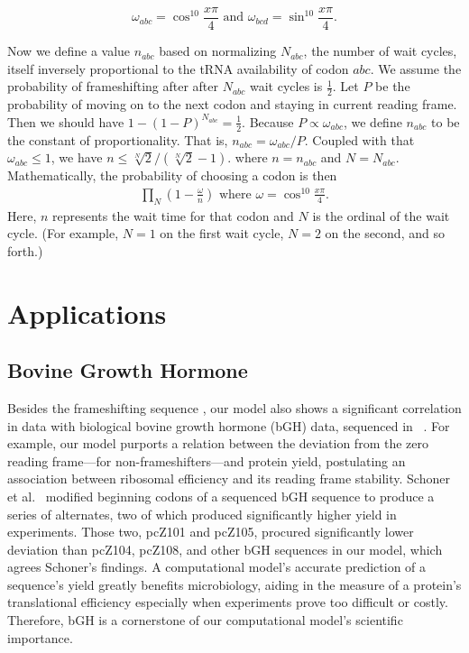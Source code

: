\documentclass[12pt, draft]{article}
\numberwithin{equation}{section}
\begin{document}
\begin{equation}
  \omega_{abc} = \cos^{10}{\frac{x\pi}{4}} \text{ and } \omega_{bcd} = \sin^{10}{\frac{x\pi}{4}}.
\end{equation}

Now we define a value $n_{abc}$ based on normalizing $N_{abc}$, the
number of wait cycles, itself inversely proportional to the
tRNA availability of codon $abc$.
We assume the probability of frameshifting after
after $N_{abc}$ wait cycles is $\frac{1}{2}$.  Let $P$ be the
probability of moving on to the next codon and staying in current reading
frame.  Then we should have $1-\left(1-P\right)^{N_{abc}} =
\frac{1}{2}$.  Because $P \propto \omega_{abc}$, we define $n_{abc}$ to be the constant of
proportionality. That is, $n_{abc} = \omega_{abc} / P$.  Coupled
with that $\omega_{abc} \le 1$, we have $n \le \sqrt[N]{2}/(\sqrt[N]{2} - 1).$
where $n = n_{abc}$ and $N = N_{abc}$. Mathematically, the probability of choosing a codon is then
\begin{align}
  \prod_N \left(1-\frac{\omega}{n}\right) \text{ where } \omega = \cos^{10}{\frac{x\pi}{4}}.
\end{align}
Here, $n$ represents the wait time for that codon and $N$ is the ordinal of the wait cycle. (For example,
$N=1$ on the first wait cycle, $N=2$ on the second, and so forth.)

\section{Applications}

\subsection{Bovine Growth Hormone}
Besides the frameshifting sequence \prfB, our model also shows a significant correlation in data with biological
bovine growth hormone (bGH) data, sequenced in \ecoli~\cite{schoner:bgh}. For example, our model purports a relation
between the deviation from the zero reading frame---for non-frameshifters---and protein yield, postulating
an association between ribosomal efficiency and its reading frame stability. Schoner et al.~\cite{schoner:bgh}
modified beginning codons of a sequenced bGH sequence to produce a series of alternates,
two of which produced significantly higher yield in experiments. Those two, pcZ101 and pcZ105, procured significantly
lower deviation than pcZ104, pcZ108, and other bGH sequences in our model, which agrees Schoner's findings.
A computational model's accurate prediction of a sequence's yield greatly benefits microbiology,
aiding in the measure of a protein's translational efficiency especially when experiments prove too difficult
or costly. Therefore, bGH is a cornerstone of our computational model's scientific importance.
\end{document}
